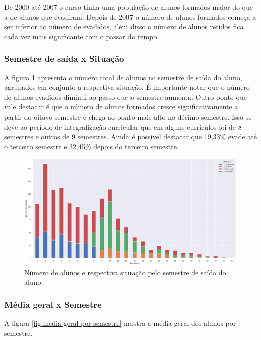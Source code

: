 \documentclass[diss,capa]{texufpel}
\begin{document}
De 2000 até 2007 o curso tinha uma população de alunos formados maior do que a de alunos que evadiram.
Depois de 2007 o número de alunos formados começa a ser inferior ao número de evadidos, além disso o número de alunos retidos fica cada vez mais significante com o passar do tempo.

\subsubsection{Semestre de saída x Situação}

A figura \ref{fig:nr-alunos-semestre-saida} apresenta o número total de alunos no semestre de saída do aluno, agrupados em conjunto a respectiva situação.
É importante notar que o número de alunos evadidos diminui ao passo que o semestre aumenta.
Outro ponto que vale destacar é que o número de alunos formados cresce significativamente a partir do oitavo semestre e chega ao ponto mais alto no décimo semestre.
Isso se deve ao período de integralização curricular que em alguns currículos foi de 8 semestres e outros de 9 semestres.
Ainda é possível destacar que 19,33\% evade até o terceiro semestre e 32,45\% depois do terceiro semestre.

\begin{figure}[htbp]
\centering \includegraphics[scale=.32]{imagens/nr-alunos-por-semestre-e-situacao.png}
\caption{Número de alunos e respectiva situação pelo semestre de saída do aluno.}
\label{fig:nr-alunos-semestre-saida}
\end{figure}

\subsubsection{Média geral x Semestre}

A figura \ref{fig:media-geral-por-semestre} mostra a média geral dos alunos por semestre.
\end{document}
